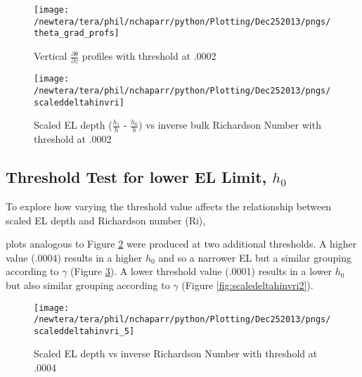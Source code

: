 \begin{figure}[htbp]
    \centering
    \texttt{[image: /newtera/tera/phil/nchaparr/python/Plotting/Dec252013/pngs/theta\_grad\_profs]}
    \caption{Vertical $\frac{\partial \overline{\theta}}{\partial z}$ profiles with threshold at .0002}
    \label{fig:thresh}   %
\end{figure}

\begin{figure}[htbp]
\centering
 \texttt{[image: /newtera/tera/phil/nchaparr/python/Plotting/Dec252013/pngs/scaleddeltahinvri]}
       
        \caption{Scaled EL depth ($\frac{h_{1}}{h}$ - $\frac{h_{0}}{h}$) vs inverse bulk Richardson Number with threshold at .0002}
         \label{fig:scaledeltahinvri}
\end{figure}

\clearpage
\subsection{Threshold Test for lower \acs{EL} Limit, $h_{0}$}
To explore how varying the threshold value affects the relationship between scaled \acs{EL} depth
and Richardson number (\acs{Ri}), 

plots analogous to Figure \ref{fig:scaledeltahinvri} were produced at two 
additional thresholds.  A higher value (.0004) results in a higher $h_{0}$   
and so a narrower \acs{EL} but a similar grouping according to $\gamma$ (Figure \ref{fig:scaledeltahinvri1}).
A lower threshold value (.0001) results in a lower $h_{0}$
but also similar grouping according to $\gamma$ (Figure \ref{fig:scaledeltahinvri2}).\\

\begin{figure}[htbp]
    \centering
    \texttt{[image: /newtera/tera/phil/nchaparr/python/Plotting/Dec252013/pngs/scaleddeltahinvri\_5]}
    \caption{Scaled EL depth vs inverse Richardson Number with threshold at .0004}
    \label{fig:scaledeltahinvri1}   %
\end{figure}

